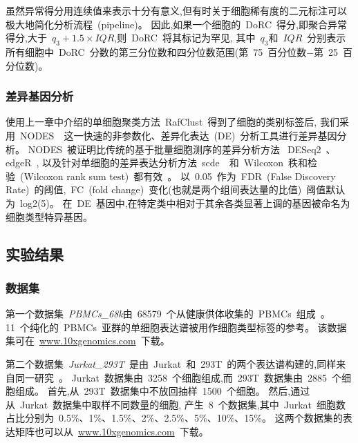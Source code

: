虽然异常得分用连续值来表示十分有意义,但有时关于细胞稀有度的二元标注可以极大地简化分析流程~(pipeline)。
因此,如果一个细胞的~DoRC~得分,即聚合异常得分,大于~$q_3 + 1.5 \times IQR$,则~DoRC~将其标记为罕见,
其中~$q_3$和~$IQR$~分别表示所有细胞中~DoRC~分数的第三分位数和四分位数范围(第~75~百分位数$-$第~25~百分位数)。

\subsubsection{差异基因分析}
\label{subsec:de}

使用上一章中介绍的单细胞聚类方法~RafClust~得到了细胞的类别标签后,
我们采用~NODES~\cite{Sengupta049734}~这一快速的非参数化、差异化表达~(DE)~分析工具进行差异基因分析。
NODES~被证明比传统的基于批量细胞测序的差异分析方法~DESeq2~\cite{love2014moderated}、edgeR~\cite{robinson2010edger},
以及针对单细胞的差异表达分析方法~scde~\cite{kharchenko2014bayesian}~和~Wilcoxon~秩和检验~(Wilcoxon rank sum test)~都有效~\cite{Sengupta049734}。
以~0.05~作为~FDR~(False Discovery Rate)~的阈值,~FC~(fold change)~变化(也就是两个组间表达量的比值)~阈值默认为~log2(5)。
在~DE~基因中,在特定类中相对于其余各类显著上调的基因被命名为细胞类型特异基因。


\subsection{实验结果}

\subsubsection{数据集}
\label{subsec:datasets} 

第一个数据集~\textit{PBMCs\_68k}由~68579~个从健康供体收集的~PBMCs~组成~\cite{zheng2017massively}。
11~个纯化的~PBMCs~亚群的单细胞表达谱被用作细胞类型标签的参考。
该数据集可在~\url{www.10xgenomics.com}~下载。


第二个数据集~\textit{Jurkat\_293T}~是由~Jurkat~和~293T~的两个表达谱构建的,同样来自同一研究~\cite{zheng2017massively}。
Jurkat~数据集由~3258~个细胞组成,而~293T~数据集由~2885~个细胞组成。
首先,从~293T~数据集中不放回抽样~1500~个细胞。
然后,通过从~Jurkat~数据集中取样不同数量的细胞,
产生~8~个数据集,其中~Jurkat~细胞数占比分别为~0.5\%、1\%、1.5\%、2\%、2.5\%、5\%、10\%、15\%。
这两个数据集的表达矩阵也可以从~\url{www.10xgenomics.com}~下载。

